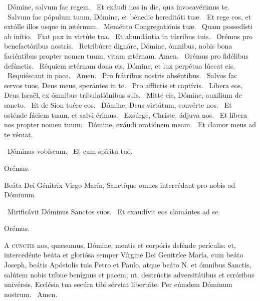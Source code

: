 
\V\ Dómine, salvum fac regem. \R\ Et exáudi nos in die, qua invocavérimus te. \V\ Salvum fac pópulum tuum, Dómine, et bénedic hereditáti tuæ. \R\ Et rege eos, et extólle illos usque in ætérnum. \V\ Meménto Congregatiónis tuæ. \R\ Quam possedísti ab inítio. \V\ Fiat pax in virtúte tua. \R\ Et abundántia in túrribus tuis. \V\ Orémus pro benefactóribus nostris. \R\ Retribúere dignáre, Dómine, ómnibus, nobis bona faciéntibus propter nomen tuum, vitam ætérnam. Amen. \V\ Orémus pro fidélibus defúnctis. \R\ Réquiem ætérnam dona eis, Dómine, et lux perpétua lúceat eis. \V\ Requiéscant in pace. \R\ Amen. \V\ Pro frátribus nostris abséntibus. \R\ Salvos fac servos tuos, Deus meus, sperántes in te. \V\ Pro afflíctis et captívis. \R\ Líbera eos, Deus Israël, ex ómnibus tribulatiónibus suis. \V\ Mitte eis, Dómine, auxílium de sancto. \R\ Et de Sion tuére eos. \V\ Dómine, Deus virtútum, convérte nos. \R\ Et osténde fáciem tuam, et salvi érimus. \V\ Exsúrge, Christe, ádjuva nos. \R\ Et líbera nos propter nomen tuum. \V\ Dómine, exáudi oratiónem meam. \R\ Et clamor meus ad te véniat.


\V\ Dóminus vobíscum. \R\ Et cum spíritu tuo.

Orémus.




 Beáta Dei Génitrix Virgo María, Sanctíque omnes intercédant pro nobis ad Dóminum.

\V\ Mirificávit Dóminus Sanctos suos. \R\ Et exaudívit eos clamántes ad se.

Orémus. 

\lettrine[lines=2]{A}{} \textsc{cunctis} nos, quæsumus, Dómine, mentis et corpóris defénde perículis: et, intercedénte beáta et gloriósa semper Vírgine Dei Genitríce María, cum beáto Joseph, beátis Apóstolis tuis Petro et Paulo, atque beáto N. et ómnibus Sanctis, salútem nobis tríbue benígnus et pacem; ut, destrúctis adversitátibus et erróribus univérsis, Ecclésia tua secúra tibi sérviat libertáte. Per eúmdem Dóminum nostrum. \R\ Amen.

